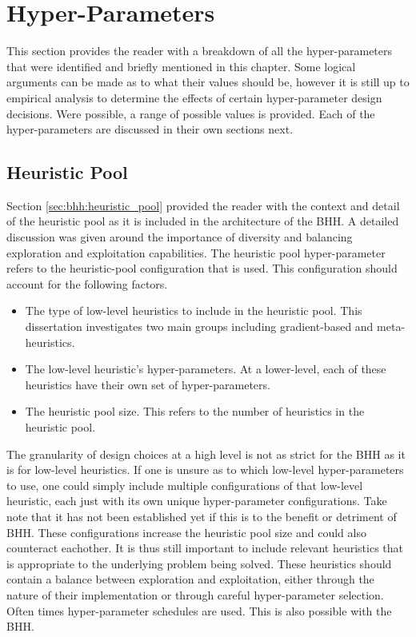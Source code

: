 \section{Hyper-Parameters}
\label{sec:bhh:hyper_parameters}

This section provides the reader with a breakdown of all the hyper-parameters that were identified and briefly mentioned in this chapter. Some logical arguments can be made as to what their values should be, however it is still up to empirical analysis to determine the effects of certain hyper-parameter design decisions. Were possible, a range of possible values is provided. Each of the hyper-parameters are discussed in their own sections next.

\subsection{Heuristic Pool}
\label{sec:bhh:hyper_parameters:heuristic_pool}

Section \ref{sec:bhh:heuristic_pool} provided the reader with the context and detail of the heuristic pool as it is included in the architecture of the \ac{BHH}. A detailed discussion was given around the importance of diversity and balancing exploration and exploitation capabilities. The heuristic pool hyper-parameter refers to the heuristic-pool configuration that is used. This configuration should account for the following factors.

\begin{itemize}
    \item The type of low-level heuristics to include in the heuristic pool. This dissertation investigates two main groups including gradient-based and meta-heuristics. 
    \item The low-level heuristic's hyper-parameters. At a lower-level, each of these heuristics have their own set of hyper-parameters.
    \item The heuristic pool size. This refers to the number of heuristics in the heuristic pool.
\end{itemize}

The granularity of design choices at a high level is not as strict for the \ac{BHH} as it is for low-level heuristics. If one is unsure as to which low-level hyper-parameters to use, one could simply include multiple configurations of that low-level heuristic, each just with its own unique hyper-parameter configurations. Take note that it has not been established yet if this is to the benefit or detriment of \ac{BHH}. These configurations increase the heuristic pool size and could also counteract eachother.  It is thus still important to include relevant heuristics that is appropriate to the underlying problem being solved. These heuristics should contain a balance between exploration and exploitation, either through the nature of their implementation or through careful hyper-parameter selection. Often times hyper-parameter schedules are used. This is also possible with the \ac{BHH}.


